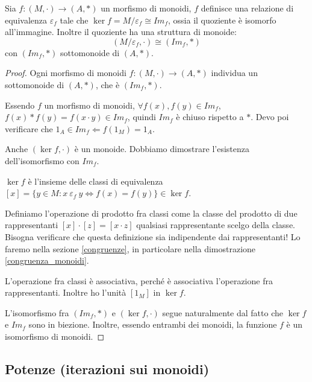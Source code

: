 \begin{prop}
Sia $f : (M, \cdot) \to (A, \ast)$ un morfismo di monoidi, $f$ definisce una relazione di equivalenza $\varepsilon_f$ tale che $\ker f = M / \varepsilon_f \cong Im_f$, ossia il quoziente \`e isomorfo all'immagine. Inoltre il quoziente ha una struttura di monoide:
\[
(M / \varepsilon_f , \cdot) \cong (Im_f, \ast)
\]
con $(Im_f, \ast)$ sottomonoide di $(A, \ast)$.
\end{prop}
\begin{proof}
Ogni morfismo di monoidi $f : (M, \cdot) \to (A, \ast)$ individua un sottomonoide di $(A, \ast)$, che \`e $(Im_f, \ast)$. 

Essendo $f$ un morfismo di monoidi, $\forall f(x), f(y) \in Im_f$, $f(x) \ast f(y) = f(x \cdot y) \in Im_f$, quindi $Im_f $ \`e chiuso rispetto a $\ast$. Devo poi verificare che $1_A \in Im_f \Leftarrow f(1_M) = 1_A$.

Anche $(\ker f, \cdot)$ \`e un monoide. Dobbiamo dimostrare l'esistenza dell'isomorfismo con $Im_f$.

$\ker f$ \`e l'insieme delle classi di equivalenza $[x] = \{ y \in M : x \ \varepsilon_f \ y \Leftrightarrow f(x) = f(y) \} \in \ker f$.

Definiamo l'operazione di prodotto fra classi come la classe del prodotto di due rappresentanti $[x] \cdot [z] = [x \cdot z]$ qualsiasi rappresentante scelgo della classe. Bisogna verificare che questa definizione sia indipendente dai rappresentanti! Lo faremo nella sezione \ref{congruenze}, in particolare nella dimostrazione \ref{congruenza_monoidi}. %

L'operazione fra classi \`e associativa, perch\'e \`e associativa l'operazione fra rappresentanti. Inoltre ho l'unit\`a $[1_M]$ in $\ker f$.

L'isomorfismo fra $(Im_f, \ast)$ e $(\ker f, \cdot)$ segue naturalmente dal fatto che $\ker f $ e $Im_f$ sono in biezione. Inoltre, essendo entrambi dei monoidi, la funzione $f$ \`e un isomorfismo di monoidi.
\end{proof}

\subsection{Potenze (iterazioni sui monoidi)}

